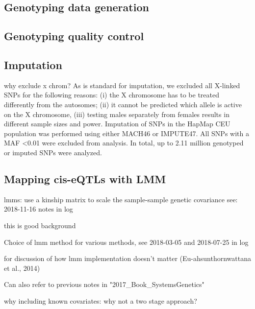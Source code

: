 \subsection{Genotyping data generation}

\subsection{Genotyping quality control}

\subsection{Imputation}

why exclude x chrom?
As is standard for imputation, we excluded all X-linked SNPs for the following reasons: (i) the X chromosome has to be treated differently from the autosomes; (ii) it cannot be predicted which allele is active on the X chromosome, (iii) testing males separately from females results in different sample sizes and power. Imputation of SNPs in the HapMap CEU population was performed using either MACH46 or IMPUTE47. All SNPs with a MAF <0.01 were excluded from analysis. In total, up to 2.11 million genotyped or imputed SNPs were analyzed.

\subsection{Mapping cis-eQTLs with LMM}

lmms: use a kinship matrix to scale the sample-sample genetic covariance
see: 2018-11-16 notes in log

this is good background

Choice of lmm method
for various methods, see 2018-03-05 and 2018-07-25 in log

for discussion of how lmm implementation doesn't matter (Eu-ahsunthornwattana et al., 2014)

Can also refer to previous notes in "2017\_Book\_SystemsGenetics"

why including known covariates: why not a two stage approach?

